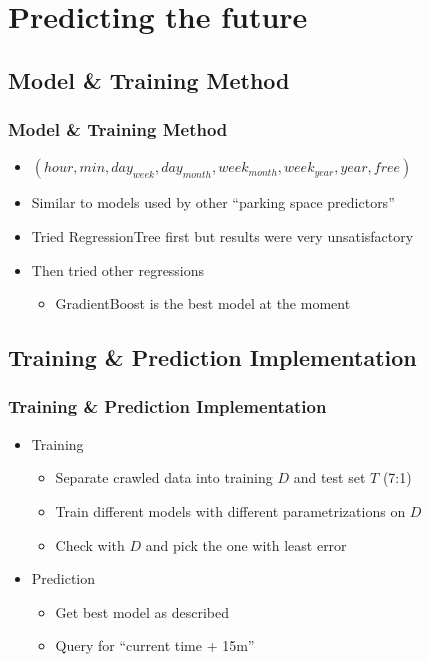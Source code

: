 \documentclass[11pt]{beamer}
\newcommand{\hod}{hour}
\newcommand{\moh}{min}
\newcommand{\dow}{day_{week}}
\newcommand{\dom}{day_{month}}
\newcommand{\wom}{week_{month}}
\newcommand{\woy}{week_{year}}
\newcommand{\yyy}{year}
\begin{document}
\section{Predicting the future}
\subsection{Model \& Training Method}
\begin{frame}
  \frametitle{Model \& Training Method}
  \begin{itemize}
    \item \((\hod, \moh, \dow, \dom, \wom, \woy, \yyy, free)\)
    \item Similar to models used by other ``parking space predictors''
    \item Tried RegressionTree first but results were very unsatisfactory
    \item Then tried other regressions
    \begin{itemize}
      \item GradientBoost is the best model at the moment
    \end{itemize}
  \end{itemize}
\end{frame}

\subsection{Training \& Prediction Implementation}
\begin{frame}
  \frametitle{Training \& Prediction Implementation}
  \begin{itemize}
    \item Training
    \begin{itemize}
      \item Separate crawled data into training \(D\) and test set \(T\) (7:1)
      \item Train different models with different parametrizations on \(D\)
      \item Check with \(D\) and pick the one with least error
    \end{itemize}
    \item Prediction
    \begin{itemize}
      \item Get best model as described
      \item Query for ``current time + 15m''
    \end{itemize}
  \end{itemize}
\end{frame}
\end{document}
